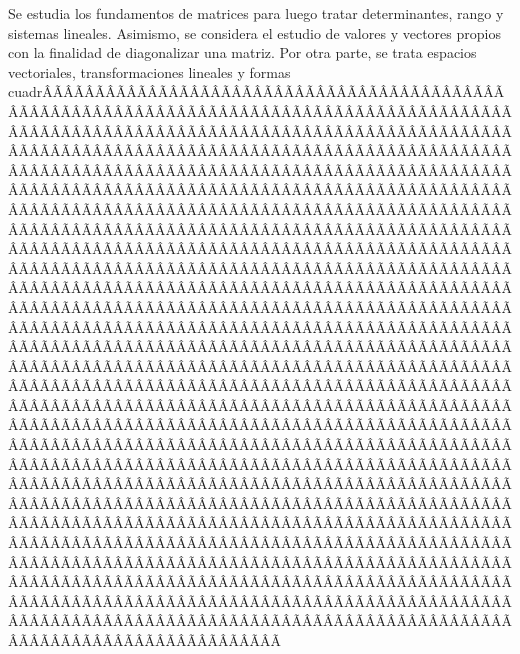 \begin{sumilla}


\begin{fundamentacion}
Se estudia los fundamentos de matrices para luego tratar determinantes, rango y sistemas lineales. Asimismo, se considera el estudio de valores y vectores propios con la finalidad de diagonalizar una matriz. Por otra parte, se trata espacios vectoriales, transformaciones lineales y formas cuadr\ÃÂÃÂÃÂÃÂÃÂÃÂÃÂÃÂÃÂÃÂÃÂÃÂÃÂÃÂÃÂÃÂÃÂÃÂÃÂÃÂÃÂÃÂÃÂÃÂÃÂÃÂÃÂÃÂÃÂÃÂÃÂÃÂÃÂÃÂÃÂÃÂÃÂÃÂÃÂÃÂÃÂÃÂÃÂÃÂÃÂÃÂÃÂÃÂÃÂÃÂÃÂÃÂÃÂÃÂÃÂÃÂÃÂÃÂÃÂÃÂÃÂÃÂÃÂÃÂÃÂÃÂÃÂÃÂÃÂÃÂÃÂÃÂÃÂÃÂÃÂÃÂÃÂÃÂÃÂÃÂÃÂÃÂÃÂÃÂÃÂÃÂÃÂÃÂÃÂÃÂÃÂÃÂÃÂÃÂÃÂÃÂÃÂÃÂÃÂÃÂÃÂÃÂÃÂÃÂÃÂÃÂÃÂÃÂÃÂÃÂÃÂÃÂÃÂÃÂÃÂÃÂÃÂÃÂÃÂÃÂÃÂÃÂÃÂÃÂÃÂÃÂÃÂÃÂÃÂÃÂÃÂÃÂÃÂÃÂÃÂÃÂÃÂÃÂÃÂÃÂÃÂÃÂÃÂÃÂÃÂÃÂÃÂÃÂÃÂÃÂÃÂÃÂÃÂÃÂÃÂÃÂÃÂÃÂÃÂÃÂÃÂÃÂÃÂÃÂÃÂÃÂÃÂÃÂÃÂÃÂÃÂÃÂÃÂÃÂÃÂÃÂÃÂÃÂÃÂÃÂÃÂÃÂÃÂÃÂÃÂÃÂÃÂÃÂÃÂÃÂÃÂÃÂÃÂÃÂÃÂÃÂÃÂÃÂÃÂÃÂÃÂÃÂÃÂÃÂÃÂÃÂÃÂÃÂÃÂÃÂÃÂÃÂÃÂÃÂÃÂÃÂÃÂÃÂÃÂÃÂÃÂÃÂÃÂÃÂÃÂÃÂÃÂÃÂÃÂÃÂÃÂÃÂÃÂÃÂÃÂÃÂÃÂÃÂÃÂÃÂÃÂÃÂÃÂÃÂÃÂÃÂÃÂÃÂÃÂÃÂÃÂÃÂÃÂÃÂÃÂÃÂÃÂÃÂÃÂÃÂÃÂÃÂÃÂÃÂÃÂÃÂÃÂÃÂÃÂÃÂÃÂÃÂÃÂÃÂÃÂÃÂÃÂÃÂÃÂÃÂÃÂÃÂÃÂÃÂÃÂÃÂÃÂÃÂÃÂÃÂÃÂÃÂÃÂÃÂÃÂÃÂÃÂÃÂÃÂÃÂÃÂÃÂÃÂÃÂÃÂÃÂÃÂÃÂÃÂÃÂÃÂÃÂÃÂÃÂÃÂÃÂÃÂÃÂÃÂÃÂÃÂÃÂÃÂÃÂÃÂÃÂÃÂÃÂÃÂÃÂÃÂÃÂÃÂÃÂÃÂÃÂÃÂÃÂÃÂÃÂÃÂÃÂÃÂÃÂÃÂÃÂÃÂÃÂÃÂÃÂÃÂÃÂÃÂÃÂÃÂÃÂÃÂÃÂÃÂÃÂÃÂÃÂÃÂÃÂÃÂÃÂÃÂÃÂÃÂÃÂÃÂÃÂÃÂÃÂÃÂÃÂÃÂÃÂÃÂÃÂÃÂÃÂÃÂÃÂÃÂÃÂÃÂÃÂÃÂÃÂÃÂÃÂÃÂÃÂÃÂÃÂÃÂÃÂÃÂÃÂÃÂÃÂÃÂÃÂÃÂÃÂÃÂÃÂÃÂÃÂÃÂÃÂÃÂÃÂÃÂÃÂÃÂÃÂÃÂÃÂÃÂÃÂÃÂÃÂÃÂÃÂÃÂÃÂÃÂÃÂÃÂÃÂÃÂÃÂÃÂÃÂÃÂÃÂÃÂÃÂÃÂÃÂÃÂÃÂÃÂÃÂÃÂÃÂÃÂÃÂÃÂÃÂÃÂÃÂÃÂÃÂÃÂÃÂÃÂÃÂÃÂÃÂÃÂÃÂÃÂÃÂÃÂÃÂÃÂÃÂÃÂÃÂÃÂÃÂÃÂÃÂÃÂÃÂÃÂÃÂÃÂÃÂÃÂÃÂÃÂÃÂÃÂÃÂÃÂÃÂÃÂÃÂÃÂÃÂÃÂÃÂÃÂÃÂÃÂÃÂÃÂÃÂÃÂÃÂÃÂÃÂÃÂÃÂÃÂÃÂÃÂÃÂÃÂÃÂÃÂÃÂÃÂÃÂÃÂÃÂÃÂÃÂÃÂÃÂÃÂÃÂÃÂÃÂÃÂÃÂÃÂÃÂÃÂÃÂÃÂÃÂÃÂÃÂÃÂÃÂÃÂÃÂÃÂÃÂÃÂÃÂÃÂÃÂÃÂÃÂÃÂÃÂÃÂÃÂÃÂÃÂÃÂÃÂÃÂÃÂÃÂÃÂÃÂÃÂÃÂÃÂÃÂÃÂÃÂÃÂÃÂÃÂÃÂÃÂÃÂÃÂÃÂÃÂÃÂÃÂÃÂÃÂÃÂÃÂÃÂÃÂÃÂÃÂÃÂÃÂÃÂÃÂÃÂÃÂÃÂÃÂÃÂÃÂÃÂÃÂÃÂÃÂÃÂÃÂÃÂÃÂÃÂÃÂÃÂÃÂÃÂÃÂÃÂÃÂÃÂÃÂÃÂÃÂÃÂÃÂÃÂÃÂÃÂÃÂÃÂÃÂÃÂÃÂÃÂÃÂÃÂÃÂÃÂÃÂÃÂÃÂÃÂÃÂÃÂÃÂÃÂÃÂÃÂÃÂÃÂÃÂÃÂÃÂÃÂÃÂÃÂÃÂÃÂÃÂÃÂÃÂÃÂÃÂÃÂÃÂÃÂÃÂÃÂÃÂÃÂÃÂÃÂÃÂÃÂÃÂÃÂÃÂÃÂÃÂÃÂÃÂÃÂÃÂÃÂÃÂÃÂÃÂÃÂÃ
\end{fundamentacion}
\end{sumilla}

